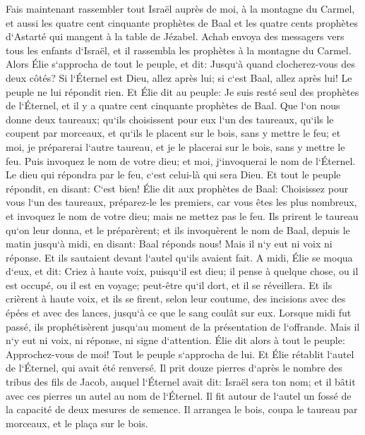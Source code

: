 \verse Fais maintenant rassembler tout Israël auprès de moi, à la montagne du Carmel, et aussi les quatre cent cinquante prophètes de Baal et les quatre cents prophètes d`Astarté qui mangent à la table de Jézabel. 
\verse Achab envoya des messagers vers tous les enfants d`Israël, et il rassembla les prophètes à la montagne du Carmel. 
\verse Alors Élie s`approcha de tout le peuple, et dit: Jusqu`à quand clocherez-vous des deux côtés? Si l`Éternel est Dieu, allez après lui; si c`est Baal, allez après lui! Le peuple ne lui répondit rien. 
\verse Et Élie dit au peuple: Je suis resté seul des prophètes de l`Éternel, et il y a quatre cent cinquante prophètes de Baal. 
\verse Que l`on nous donne deux taureaux; qu`ils choisissent pour eux l`un des taureaux, qu`ils le coupent par morceaux, et qu`ils le placent sur le bois, sans y mettre le feu; et moi, je préparerai l`autre taureau, et je le placerai sur le bois, sans y mettre le feu. 
\verse Puis invoquez le nom de votre dieu; et moi, j`invoquerai le nom de l`Éternel. Le dieu qui répondra par le feu, c`est celui-là qui sera Dieu. Et tout le peuple répondit, en disant: C`est bien! 
\verse Élie dit aux prophètes de Baal: Choisissez pour vous l`un des taureaux, préparez-le les premiers, car vous êtes les plus nombreux, et invoquez le nom de votre dieu; mais ne mettez pas le feu. 
\verse Ils prirent le taureau qu`on leur donna, et le préparèrent; et ils invoquèrent le nom de Baal, depuis le matin jusqu`à midi, en disant: Baal réponds nous! Mais il n`y eut ni voix ni réponse. Et ils sautaient devant l`autel qu`ils avaient fait. 
\verse A midi, Élie se moqua d`eux, et dit: Criez à haute voix, puisqu`il est dieu; il pense à quelque chose, ou il est occupé, ou il est en voyage; peut-être qu`il dort, et il se réveillera. 
\verse Et ils crièrent à haute voix, et ils se firent, selon leur coutume, des incisions avec des épées et avec des lances, jusqu`à ce que le sang coulât sur eux. 
\verse Lorsque midi fut passé, ils prophétisèrent jusqu`au moment de la présentation de l`offrande. Mais il n`y eut ni voix, ni réponse, ni signe d`attention. 
\verse Élie dit alors à tout le peuple: Approchez-vous de moi! Tout le peuple s`approcha de lui. Et Élie rétablit l`autel de l`Éternel, qui avait été renversé. 
\verse Il prit douze pierres d`après le nombre des tribus des fils de Jacob, auquel l`Éternel avait dit: Israël sera ton nom; 
\verse et il bâtit avec ces pierres un autel au nom de l`Éternel. Il fit autour de l`autel un fossé de la capacité de deux mesures de semence. 
\verse Il arrangea le bois, coupa le taureau par morceaux, et le plaça sur le bois. 
